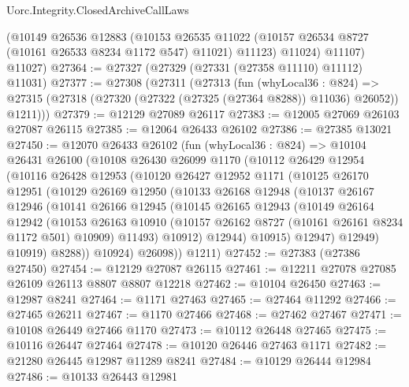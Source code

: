 \begin{lexlean}{Uorc.Integrity.ClosedArchiveCallLaws}
\begin{coremodule}
        (@10149
          @26536
          @12883
          (@10153
            @26535
            @11022
            (@10157 @26534 @8727 (@10161 @26533 @8234 @1172 @547) @11021)
            @11123)
          @11024)
        @11107)
      @11027)
@27364 := @27327 (@27329 (@27331 (@27358 @11110) @11112) @11031)
@27377 := @27308
    (@27311
      (@27313
        (fun (whyLocal36 : @824) =>
        @27315 (@27318 (@27320 (@27322 (@27325 (@27364 @8288)) @11036) @26052)) @1211)))
@27379 := @12129 @27089 @26117
@27383 := @12005 @27069 @26103 @27087 @26115
@27385 := @12064 @26433 @26102
@27386 := @27385 @13021
@27450 := @12070
    @26433
    @26102
    (fun (whyLocal36 : @824) =>
    @10104
      @26431
      @26100
      (@10108
        @26430
        @26099
        @1170
        (@10112
          @26429
          @12954
          (@10116
            @26428
            @12953
            (@10120
              @26427
              @12952
              @1171
              (@10125
                @26170
                @12951
                (@10129
                  @26169
                  @12950
                  (@10133
                    @26168
                    @12948
                    (@10137
                      @26167
                      @12946
                      (@10141
                        @26166
                        @12945
                        (@10145
                          @26165
                          @12943
                          (@10149
                            @26164
                            @12942
                            (@10153
                              @26163
                              @10910
                              (@10157 @26162 @8727 (@10161 @26161 @8234 @1172 @501) @10909)
                              @11493)
                            @10912)
                          @12944)
                        @10915)
                      @12947)
                    @12949)
                  @10919)
                @8288))
            @10924)
          @26098))
      @1211)
@27452 := @27383 (@27386 @27450)
@27454 := @12129 @27087 @26115
@27461 := @12211 @27078 @27085 @26109 @26113 @8807 @8807 @12218
@27462 := @10104 @26450
@27463 := @12987 @8241
@27464 := @1171 @27463
@27465 := @27464 @11292
@27466 := @27465 @26211
@27467 := @1170 @27466
@27468 := @27462 @27467
@27471 := @10108 @26449 @27466 @1170
@27473 := @10112 @26448 @27465
@27475 := @10116 @26447 @27464
@27478 := @10120 @26446 @27463 @1171
@27482 := @21280 @26445 @12987 @11289 @8241
@27484 := @10129 @26444 @12984
@27486 := @10133 @26443 @12981

\end{coremodule}
\end{lexlean}
